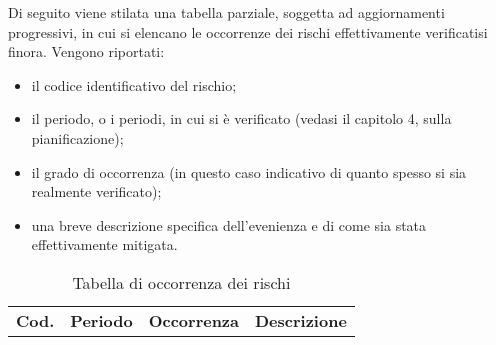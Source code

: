 \hypertarget{Tabellaoccorrenzarischi}{}
Di seguito viene stilata una tabella parziale, soggetta ad aggiornamenti progressivi, in cui si elencano le occorrenze dei rischi effettivamente verificatisi finora. Vengono riportati:
\begin{itemize}
    \item il codice identificativo del rischio;
    \item il periodo, o i periodi, in cui si è verificato (vedasi il capitolo 4, sulla pianificazione);
    \item il grado di occorrenza (in questo caso indicativo di quanto spesso si sia realmente verificato);
    \item una breve descrizione specifica dell'evenienza e di come sia stata effettivamente mitigata.
\end{itemize}
{
        \renewcommand{\arraystretch}{1.5}
        \centering
        \begin{longtable}{|p{0.8cm}|p{1.2cm}|p{2cm}|p{8.8cm}|}
        \caption{Tabella di occorrenza dei rischi}\\
        \rowcolor{\primaryColor}
        \textcolor{\secondaryColor}{\textbf{Cod.}} & 
        \textcolor{\secondaryColor}{\textbf{Periodo}} & 
        \textcolor{\secondaryColor}{\textbf{Occorrenza}} & 
        \textcolor{\secondaryColor}{\textbf{Descrizione}}\\
       

\end{longtable}}
